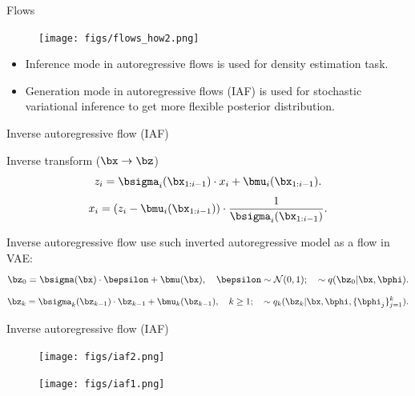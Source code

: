 \begin{frame}{Flows}
	\begin{figure}
		\texttt{[image: figs/flows\_how2.png]}
	\end{figure}
	\begin{itemize}	
		\item Inference mode in autoregressive flows is used for density estimation task.
		\item Generation mode in autoregressive flows (IAF) is used for stochastic variational inference to get more flexible posterior distribution.
	\end{itemize}
	
\end{frame}
\begin{frame}{Inverse autoregressive flow (IAF)}
	
	\begin{block}{Inverse transform ($\bx \rightarrow \bz$)}
		\vspace{-0.2cm}
		\[
		z_i = \bsigma_i (\bx_{1:i-1}) \cdot x_i + \bmu_i(\bx_{1:i-1}).
		\]
		\[
		x_i = \left( z_i - \bmu_i(\bx_{1:i-1})\right) \cdot \frac{1}{\bsigma_i (\bx_{1:i-1})}.
		\]
		\vspace{-0.3cm}
	\end{block}
	Inverse autoregressive flow use such inverted autoregressive model as a flow in VAE:
	\[
	\bz_0 = \bsigma(\bx) \cdot \bepsilon + \bmu(\bx), \quad \bepsilon \sim \mathcal{N}(0, 1); \quad  \sim q(\bz_0 | \bx, \bphi).
	\]
	\[
	\bz_k = \bsigma_k(\bz_{k - 1}) \cdot \bz_{k-1} + \bmu_k(\bz_{k - 1}), \quad k \geq 1; \quad  \sim q_k(\bz_k | \bx, \bphi, \{\bphi_j\}_{j=1}^k).
	\]
	
\end{frame}
\begin{frame}{Inverse autoregressive flow (IAF)}
	\begin{figure}
		\texttt{[image: figs/iaf2.png]}
	\end{figure}
	\begin{figure}
		\texttt{[image: figs/iaf1.png]}
	\end{figure}

\end{frame}
